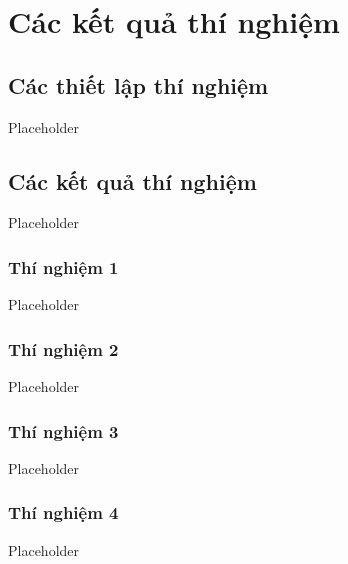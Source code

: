 \chapter{Các kết quả thí nghiệm}
\label{Chapter4}

\section{Các thiết lập thí nghiệm}

Placeholder

\section{Các kết quả thí nghiệm}

Placeholder

\subsection{Thí nghiệm 1}

Placeholder

\subsection{Thí nghiệm 2}

Placeholder

\subsection{Thí nghiệm 3}

Placeholder

\subsection{Thí nghiệm 4}

Placeholder